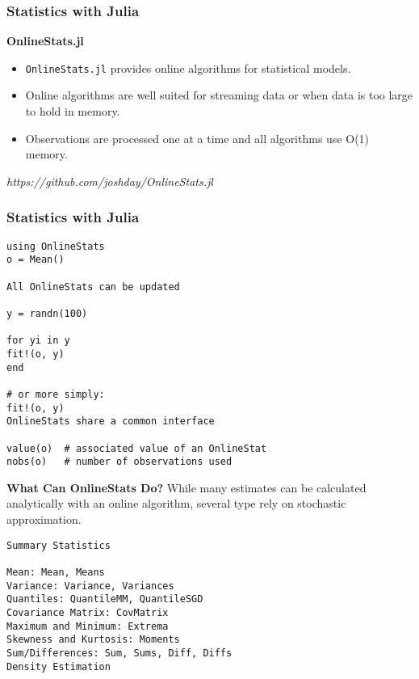 \documentclass[Master.tex]{subfiles}
\begin{document}

\begin{frame}
\frametitle{Statistics with Julia}
\noindent \textbf{OnlineStats.jl}
\begin{itemize}
	\item \texttt{OnlineStats.jl} provides online algorithms for statistical models.
	
\item Online algorithms are well suited for streaming data or when data is too large to hold in memory.
	
\item Observations are processed one at a time and all algorithms use O(1) memory.
	
\end{itemize}


\textit{https://github.com/joshday/OnlineStats.jl}
\end{frame}
\begin{frame}[fragile]
\frametitle{Statistics with Julia}
%
%

\begin{verbatim}
using OnlineStats
o = Mean()

All OnlineStats can be updated

y = randn(100)

for yi in y
fit!(o, y)
end

# or more simply:
fit!(o, y)
OnlineStats share a common interface

value(o)  # associated value of an OnlineStat
nobs(o)   # number of observations used
\end{verbatim}


\end{frame}
\begin{frame}[fragile]
\noindent \textbf{What Can OnlineStats Do?}	
While many estimates can be calculated analytically with an online algorithm, several type rely on stochastic approximation.
\begin{verbatim}
Summary Statistics

Mean: Mean, Means
Variance: Variance, Variances
Quantiles: QuantileMM, QuantileSGD
Covariance Matrix: CovMatrix
Maximum and Minimum: Extrema
Skewness and Kurtosis: Moments
Sum/Differences: Sum, Sums, Diff, Diffs
Density Estimation
\end{verbatim}
\end{frame}
\end{document}
